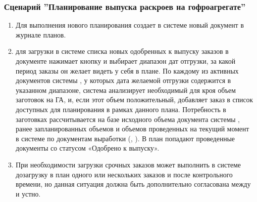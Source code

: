 \subsubsection{Сценарий ''Планирование выпуска раскроев на гофроагрегате''}
\label{bp:plan_3}


\begin{enumerate}


\item Для выполнения нового планирования \planner создает в системе \gofro новый документ  в журнале планов. 
\item	\planner  для загрузки в системе \gofro списка новых одобренных \manager к выпуску заказов  в документе  нажимает кнопку  и выбирает диапазон дат отгрузки, за какой период заказы он желает видеть у себя в плане. По каждому из активных документов  системы \gofro, у которых дата желаемой отгрузки содержится в указанном диапазоне, система \gofro анализирует необходимый для кроя объем заготовок на ГА, и, если этот объем положительный, добавляет заказ в список доступных для планирования в рамках данного плана. Потребность в заготовках рассчитывается на базе исходного объема документа  системы \gofro, ранее запланированных объемов и объемов проведенных на текущий момент в системе \gofro по документам выработки (, ). В план попадают проведенные документы  со статусом «Одобрено к выпуску».
\item	При необходимости загрузки срочных заказов \planner может выполнить в системе \gofro дозагрузку в план одного или нескольких заказов и после контрольного времени, но данная ситуация должна быть дополнительно согласована между \manager  и \planner устно.

\end{enumerate}
